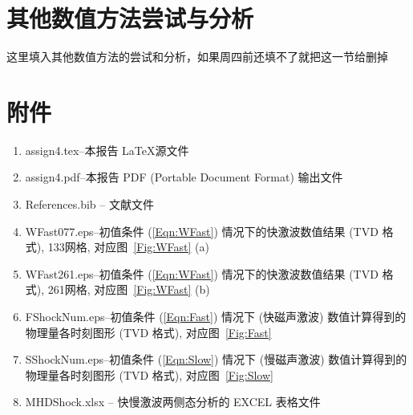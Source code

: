 \documentclass[10.5pt
]{article}
\begin{document}
\section{其他数值方法尝试与分析}
这里填入其他数值方法的尝试和分析，如果周四前还填不了就把这一节给删掉

\section{附件}
\begin{enumerate}
\item
assign4.tex--本报告 \LaTeX 源文件
\item
assign4.pdf--本报告 PDF (Portable Document Format) 输出文件
\item
References.bib -- 文献文件
\item
WFast077.eps--初值条件 (\ref{Eqn:WFast}) 情况下的快激波数值结果 (TVD 格式), 133网格, 对应图~\ref{Fig:WFast} (a)
\item
WFast261.eps--初值条件 (\ref{Eqn:WFast}) 情况下的快激波数值结果 (TVD 格式), 261网格, 对应图~\ref{Fig:WFast} (b)
\item
FShockNum.eps--初值条件 (\ref{Eqn:Fast}) 情况下 (快磁声激波) 数值计算得到的物理量各时刻图形 (TVD 格式), 对应图~\ref{Fig:Fast}
\item
SShockNum.eps--初值条件 (\ref{Eqn:Slow}) 情况下 (慢磁声激波) 数值计算得到的物理量各时刻图形 (TVD 格式), 对应图~\ref{Fig:Slow}
\item
MHDShock.xlsx -- 快慢激波两侧态分析的 EXCEL 表格文件
\end{enumerate}


% 
%


\end{document}
